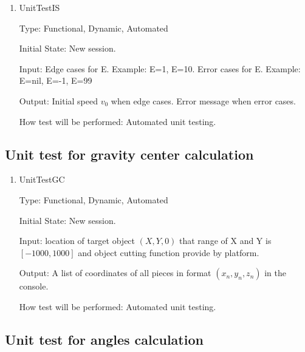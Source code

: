 \documentclass[12pt, titlepage]{article}
\begin{document}
\begin{enumerate}
	
	\item{UnitTestIS\\}
	
	Type: Functional, Dynamic, Automated
	
	Initial State: New session.
	
	Input: Edge cases for E. Example: E=1, E=10.
		Error cases for E. Example: E=nil, E=-1, E=99
	
	Output: Initial speed $v_{0}$ when edge cases.
			Error message when error cases.
	
	How test will be performed: Automated unit testing.
	
\end{enumerate}

\subsection{Unit test for gravity center calculation}

\begin{enumerate}
	
	\item{UnitTestGC\\}
	
	Type: Functional, Dynamic, Automated
	
	Initial State: New session.
	
	Input: location of target object $(X,Y,0)$ that range of X and Y is $[-1000,1000]$ and object cutting function provide by platform. 
	
	Output: A list of coordinates of all pieces in format $(x_{n},y_{n},z_{n})$ in the console.
	
	How test will be performed: Automated unit testing.
	
\end{enumerate}

\subsection{Unit test for angles calculation}
\end{document}
